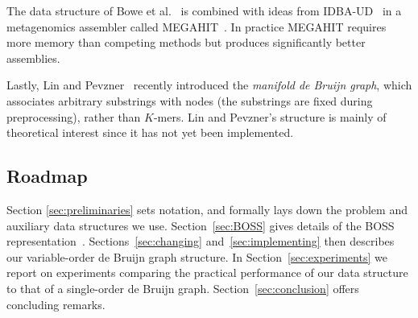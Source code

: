 The data structure of Bowe et al.~\cite{BOSS12}
is combined with ideas from IDBA-UD~\cite{idbaud} in a metagenomics assembler
called MEGAHIT~\cite{megahit}.  In practice MEGAHIT requires more memory than
competing methods 
but produces significantly better assemblies.

Lastly, Lin and Pevzner~\cite{mdbg} recently introduced the {\em manifold de
Bruijn graph}, which 
associates arbitrary substrings with nodes (the substrings are fixed during
preprocessing), rather than $K$-mers. Lin and Pevzner's structure is mainly of
theoretical interest since it has not yet been implemented.

\subsection{Roadmap} Section \ref{sec:preliminaries} sets notation, and formally
lays down the problem and auxiliary data structures we use.
Section~\ref{sec:BOSS} gives details of the BOSS representation~\cite{BOSS12}.
Sections~\ref{sec:changing} and~\ref{sec:implementing} then describes our
variable-order de Bruijn graph structure. In Section~\ref{sec:experiments} we
report on experiments comparing the practical performance of our data structure
to that of a single-order de Bruijn graph. Section~\ref{sec:conclusion} offers
concluding remarks.

